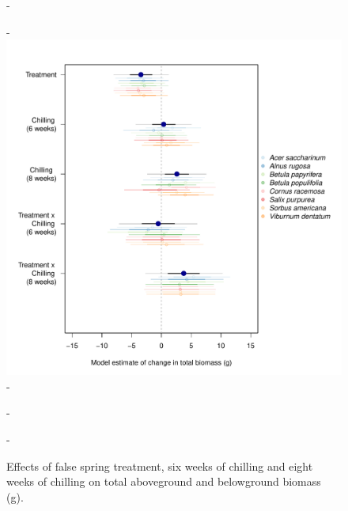 \documentclass{article}\usepackage[]{graphicx}\usepackage[]{color}
\begin{document}
{\begin{figure} [H]
  -\begin{center}
  -\includegraphics[width=14cm]{..//analyses/figures/totbiomass50and90_brms.pdf} 
  -\caption{Effects of false spring treatment, six weeks of chilling and eight weeks of chilling on total aboveground and belowground biomass (g). }\label{fig:mutotbio}
  -\end{center}
  -\end{figure}}
  
\end{document}

